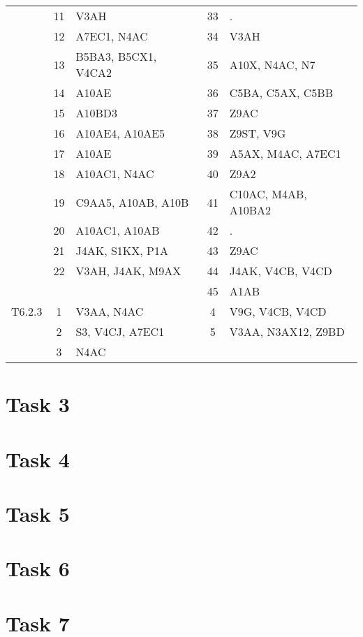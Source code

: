 \begin{table}[htbp]
\begin{tabular}{c c l c l}
	 & 11 & V3AH & 33 & . \\
	 & 12 & A7EC1, N4AC & 34 & V3AH \\
	 & 13 & B5BA3, B5CX1, V4CA2 & 35 & A10X, N4AC, N7 \\
	 & 14 & A10AE & 36 & C5BA, C5AX, C5BB \\
	 & 15 & A10BD3 & 37 & Z9AC \\
	 & 16 & A10AE4, A10AE5 & 38 & Z9ST, V9G \\
	 & 17 & A10AE & 39 & A5AX, M4AC, A7EC1 \\
	 & 18 & A10AC1, N4AC & 40 & Z9A2 \\
	 & 19 & C9AA5, A10AB, A10B & 41 & C10AC, M4AB, A10BA2 \\
	 & 20 & A10AC1, A10AB & 42 & . \\
	 & 21 & J4AK, S1KX, P1A & 43 & Z9AC \\
	 & 22 & V3AH, J4AK, M9AX & 44 & J4AK, V4CB, V4CD \\
	 & & & 45 & A1AB \\
	\addlinespace
	T6.2.3 & 1 & V3AA, N4AC & 4 & V9G, V4CB, V4CD \\
	 & 2 & S3, V4CJ, A7EC1 & 5 & V3AA, N3AX12, Z9BD \\
	 & 3 & N4AC & & \\
	\bottomrule
\end{tabular}
\end{table}


\section{Task 3}


\section{Task 4}


\section{Task 5}


\section{Task 6}


\section{Task 7}


